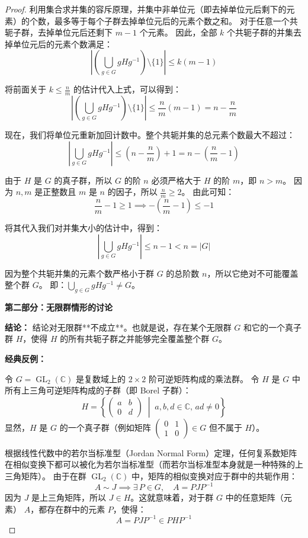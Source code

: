 \documentclass[]{article}
\begin{document}
\begin{proof}
利用集合求并集的容斥原理，并集中非单位元（即去掉单位元后剩下的元素）的个数，最多等于每个子群去掉单位元后的元素个数之和。
对于任意一个共轭子群，去掉单位元后还剩下 $m - 1$ 个元素。
因此，全部 $k$ 个共轭子群的并集去掉单位元后的元素个数满足：
\[ \left| \left( \bigcup_{g \in G} gHg^{-1} \right) \setminus \{1\} \right| \le k(m - 1) \]

将前面关于 $k \le \frac{n}{m}$ 的估计代入上式，可以得到：
\[ \left| \left( \bigcup_{g \in G} gHg^{-1} \right) \setminus \{1\} \right| \le \frac{n}{m} (m - 1) = n - \frac{n}{m} \]

现在，我们将单位元重新加回计数中。整个共轭并集的总元素个数最大不超过：
\[ \left| \bigcup_{g \in G} gHg^{-1} \right| \le \left( n - \frac{n}{m} \right) + 1 = n - \left( \frac{n}{m} - 1 \right) \]

由于 $H$ 是 $G$ 的真子群，所以 $G$ 的阶 $n$ 必须严格大于 $H$ 的阶 $m$，即 $n > m$。
因为 $n, m$ 是正整数且 $m$ 是 $n$ 的因子，所以 $\frac{n}{m} \ge 2$。
由此可知：
\[ \frac{n}{m} - 1 \ge 1 \implies -\left( \frac{n}{m} - 1 \right) \le -1 \]

将其代入我们对并集大小的估计中，得到：
\[ \left| \bigcup_{g \in G} gHg^{-1} \right| \le n - 1 < n = |G| \]

因为整个共轭并集的元素个数严格小于群 $G$ 的总阶数 $n$，所以它绝对不可能覆盖整个群 $G$。
即：$\bigcup_{g \in G} gHg^{-1} \neq G$。

\bigskip
\noindent \textbf{第二部分：无限群情形的讨论}

\medskip
\noindent \textbf{结论：} 
结论对无限群**不成立**。也就是说，存在某个无限群 $G$ 和它的一个真子群 $H$，使得 $H$ 的所有共轭子群之并能够完全覆盖整个群 $G$。

\medskip
\noindent \textbf{经典反例：}

令 $G = \operatorname{GL}_2(\mathbb{C})$ 是复数域上的 $2 \times 2$ 阶可逆矩阵构成的乘法群。
令 $H$ 是 $G$ 中所有上三角可逆矩阵构成的子群（即 Borel 子群）：
\[ H = \left\{ \begin{pmatrix} a & b \\ 0 & d \end{pmatrix} \;\middle|\; a, b, d \in \mathbb{C}, \, ad \neq 0 \right\} \]
显然，$H$ 是 $G$ 的一个真子群（例如矩阵 $\begin{pmatrix} 0 & 1 \\ 1 & 0 \end{pmatrix} \in G$ 但不属于 $H$）。

根据线性代数中的若尔当标准型（Jordan Normal Form）定理，任何复系数矩阵在相似变换下都可以被化为若尔当标准型（而若尔当标准型本身就是一种特殊的上三角矩阵）。
由于在群 $\operatorname{GL}_2(\mathbb{C})$ 中，矩阵的相似变换对应于群中的共轭作用：
\[ A \sim J \implies \exists \, P \in G, \quad A = PJ P^{-1} \]
因为 $J$ 是上三角矩阵，所以 $J \in H$。这就意味着，对于群 $G$ 中的任意矩阵（元素） $A$，都存在群中的元素 $P$，使得：
\[ A = P J P^{-1} \in P H P^{-1} \]


\end{proof}
\end{document}
